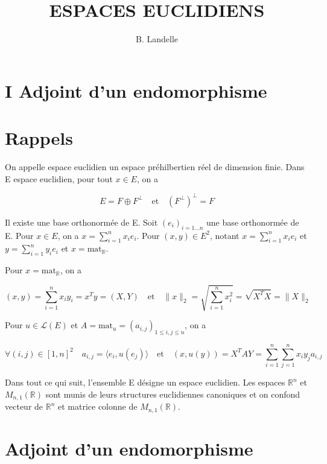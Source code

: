 

\title{ESPACES EUCLIDIENS}
\author{B. Landelle}
\date{}
\maketitle

\tableofcontents

\section*{I Adjoint d'un endomorphisme}



\section{Rappels}

On appelle espace euclidien un espace préhilbertien réel de dimension finie. Dans E espace euclidien, pour tout $x \in E$, on a

\[ E = F \oplus F^\perp \quad \text{et} \quad (F^\perp)^\perp = F \]

Il existe une base orthonormée de E. Soit $\left(e_i\right)_{i=1 \dots n}$ une base orthonormée de E. Pour $x \in E$, on a $x = \sum_{i=1}^n x_i e_i$. Pour $(x, y) \in E^2$, notant $x = \sum_{i=1}^n x_i e_i$ et $y = \sum_{i=1}^n y_i e_i$ et $x = \text{mat}_{\mathbb{R}}$.

Pour $x = \text{mat}_{\mathbb{R}}$, on a

\[ (x, y) = \sum_{i=1}^n x_i y_i = x^T y = (X, Y) \quad \text{et} \quad \|x\|_2 = \sqrt{\sum_{i=1}^n x_i^2} = \sqrt{X^T X} = \|X\|_2 \]

Pour $u \in \mathcal{L}(E)$ et $A = \text{mat}_u = (a_{i, j})_{1 \leq i, j \leq n}$, on a

\[ \forall (i, j) \in [1, n]^2 \quad a_{i, j} = \langle e_i, u(e_j) \rangle \quad \text{et} \quad (x, u(y)) = X^T A Y = \sum_{i=1}^n \sum_{j=1}^n x_i y_j a_{i, j} \]

Dans tout ce qui suit, l'ensemble E désigne un espace euclidien. Les espaces $\mathbb{R}^n$ et $M_{n, 1}(\mathbb{R})$ sont munis de leurs structures euclidiennes canoniques et on confond vecteur de $\mathbb{R}^n$ et matrice colonne de $M_{n, 1}(\mathbb{R})$.

\section{Adjoint d'un endomorphisme}

